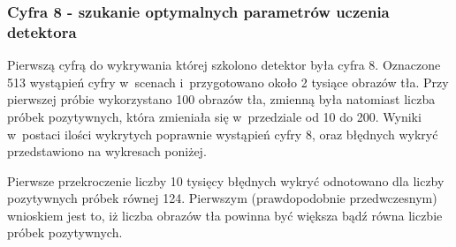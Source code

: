 \subsubsection{Cyfra 8 - szukanie optymalnych parametrów uczenia detektora}

Pierwszą cyfrą do wykrywania której szkolono detektor była cyfra 8.
Oznaczone 513 wystąpień cyfry w~scenach i~przygotowano około 2 tysiące
obrazów tła. Przy pierwszej próbie wykorzystano 100 obrazów tła, zmienną
była natomiast liczba próbek pozytywnych, która zmieniała się w~przedziale
od 10 do 200. Wyniki w~postaci ilości wykrytych poprawnie wystąpień cyfry
8, oraz błędnych wykryć przedstawiono na wykresach poniżej.

\begin{center}
\end{center}

Pierwsze przekroczenie liczby 10 tysięcy błędnych wykryć odnotowano dla
liczby pozytywnych próbek równej 124. Pierwszym (prawdopodobnie przedwczesnym)
wnioskiem jest to, iż liczba obrazów tła powinna być
większa bądź równa liczbie próbek pozytywnych.

\begin{center}
\end{center}

